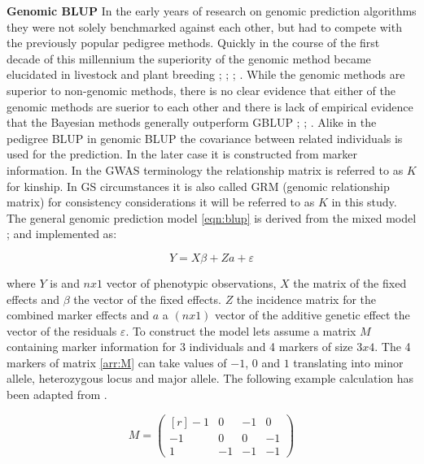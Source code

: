 \textbf{Genomic BLUP} \newline
In the early years of research on genomic prediction algorithms they were not solely benchmarked against each
other, but had to compete with the previously popular pedigree methods. Quickly in the course of the first
decade of this millennium the superiority of the genomic method became elucidated in livestock and plant
breeding \cite{habier2007impact}; \cite{vanraden2008efficient}; \cite{vanraden2008reliability};
\cite{harris2009genomic}.  While the genomic methods are superior to non-genomic methods, there is no clear
evidence that either of the genomic methods are suerior to each other and there is lack of empirical evidence
that the Bayesian methods generally outperform GBLUP \cite{moser2009comparison} ; \cite{bernardo2010breeding};
\cite{azodi2019}.  Alike in the pedigree BLUP in genomic BLUP the covariance between related individuals is
used for the prediction. In the later case it is constructed from marker information. In the GWAS terminology
the relationship matrix is referred to as $K$ for kinship. In GS circumstances it is also called GRM (genomic
relationship matrix) for consistency considerations it will be referred to as $K$ in this study. The general
genomic prediction model \ref{eqn:blup} is derived from the mixed model \cite{henderson1975best}; \cite{vanraden2008efficient} and implemented as:

\begin{equation}
Y = X \beta  +  Za + \varepsilon
  \label{eqn:blup}
\end{equation}

where $Y$ is and $nx1$ vector of phenotypic observations, $X$ the matrix of the fixed effects and $\beta$ the
vector of the fixed effects. $Z$ the incidence matrix for the combined marker effects and $a$ a $(nx1)$ vector
of the additive genetic effect the vector of the residuals $\varepsilon$.  To construct the model lets assume
a matrix $M$ containing marker information for 3 individuals and 4 markers of size $3x4$. The 4 markers of matrix \ref{arr:M} can take values of $-1$, $0$ and $1$ translating into minor allele, heterozygous locus and major allele. The following example calculation has been adapted from \cite{isik2013}.

\begin{equation}
  M = 
  \begin{pmatrix}[r]
    -1 &  0 & -1 &  0 \\
    -1 &  0 &  0 & -1 \\
     1 & -1 & -1 & -1 
  \end{pmatrix}
  \label{arr:M}
\end{equation}

